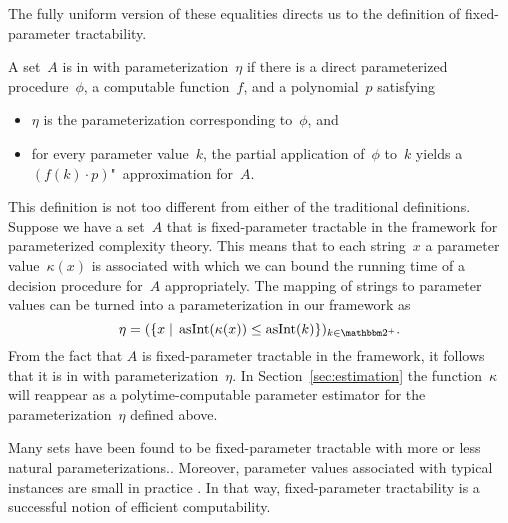 The fully uniform version of these equalities directs us to the definition of fixed-parameter tractability.
\begin{definition}
\label{def:fpt}%
  A set~$A$ is in  with parameterization~$\eta$ if there is a direct parameterized procedure~$\phi$, a computable function~$f$, and a polynomial~$p$ satisfying
  \begin{itemize}
  \item $\eta$ is the parameterization corresponding to~$\phi$, and
  \item for every parameter value~$k$, the partial application of~$\phi$ to~$k$ yields a $(f(k) \cdot p)$"~approximation for~$A$.
  \end{itemize}
\end{definition}

This definition is not too different from either of the traditional definitions.
Suppose we have a set~$A$ that is fixed-parameter tractable in the \citeauthor{flum2006parameterized} framework for parameterized complexity theory.
This means that to each string~$x$ a parameter value~$\kappa(x)$ is associated with which we can bound the running time of a decision procedure for~$A$ appropriately.
The mapping of strings to parameter values can be turned into a parameterization in our framework as
\begin{equation}
\label{eq:flum_parameterization}
  \eta \deq (\{x \st \asNat(\kappa(x)) \le \asNat(k)\})_{k \in \binary^+}. \notag
\end{equation}
From the fact that $A$ is fixed-parameter tractable in the \citeauthor{flum2006parameterized} framework, it follows that it is in  with parameterization~$\eta$.
In Section~\ref{sec:estimation} the function~$\kappa$ will reappear as a polytime-computable parameter estimator for the parameterization~$\eta$ defined above.

Many sets have been found to be fixed-parameter tractable \parencite{downey1995fixed,niedermeier2006invitation,cygan2015parameterized} with more or less natural parameterizations..
Moreover, parameter values associated with typical instances are small in practice \parencite{downey1999framework,downey1999parameterized}.
In that way, fixed-parameter tractability is a successful notion of efficient computability.

